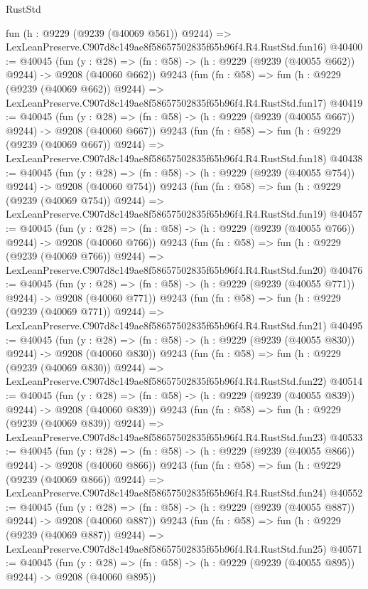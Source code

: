 \begin{lexlean}{RustStd}
\begin{coremodule}
    fun (h : @9229 (@9239 (@40069 @561)) @9244) =>
    LexLeanPreserve.C907d8c149ae8f58657502835f65b96f4.R4.RustStd.fun16)
@40400 := @40045
    (fun (y : @28) => (fn : @58) -> (h : @9229 (@9239 (@40055 @662)) @9244) -> @9208 (@40060 @662))
    @9243
    (fun (fn : @58) =>
    fun (h : @9229 (@9239 (@40069 @662)) @9244) =>
    LexLeanPreserve.C907d8c149ae8f58657502835f65b96f4.R4.RustStd.fun17)
@40419 := @40045
    (fun (y : @28) => (fn : @58) -> (h : @9229 (@9239 (@40055 @667)) @9244) -> @9208 (@40060 @667))
    @9243
    (fun (fn : @58) =>
    fun (h : @9229 (@9239 (@40069 @667)) @9244) =>
    LexLeanPreserve.C907d8c149ae8f58657502835f65b96f4.R4.RustStd.fun18)
@40438 := @40045
    (fun (y : @28) => (fn : @58) -> (h : @9229 (@9239 (@40055 @754)) @9244) -> @9208 (@40060 @754))
    @9243
    (fun (fn : @58) =>
    fun (h : @9229 (@9239 (@40069 @754)) @9244) =>
    LexLeanPreserve.C907d8c149ae8f58657502835f65b96f4.R4.RustStd.fun19)
@40457 := @40045
    (fun (y : @28) => (fn : @58) -> (h : @9229 (@9239 (@40055 @766)) @9244) -> @9208 (@40060 @766))
    @9243
    (fun (fn : @58) =>
    fun (h : @9229 (@9239 (@40069 @766)) @9244) =>
    LexLeanPreserve.C907d8c149ae8f58657502835f65b96f4.R4.RustStd.fun20)
@40476 := @40045
    (fun (y : @28) => (fn : @58) -> (h : @9229 (@9239 (@40055 @771)) @9244) -> @9208 (@40060 @771))
    @9243
    (fun (fn : @58) =>
    fun (h : @9229 (@9239 (@40069 @771)) @9244) =>
    LexLeanPreserve.C907d8c149ae8f58657502835f65b96f4.R4.RustStd.fun21)
@40495 := @40045
    (fun (y : @28) => (fn : @58) -> (h : @9229 (@9239 (@40055 @830)) @9244) -> @9208 (@40060 @830))
    @9243
    (fun (fn : @58) =>
    fun (h : @9229 (@9239 (@40069 @830)) @9244) =>
    LexLeanPreserve.C907d8c149ae8f58657502835f65b96f4.R4.RustStd.fun22)
@40514 := @40045
    (fun (y : @28) => (fn : @58) -> (h : @9229 (@9239 (@40055 @839)) @9244) -> @9208 (@40060 @839))
    @9243
    (fun (fn : @58) =>
    fun (h : @9229 (@9239 (@40069 @839)) @9244) =>
    LexLeanPreserve.C907d8c149ae8f58657502835f65b96f4.R4.RustStd.fun23)
@40533 := @40045
    (fun (y : @28) => (fn : @58) -> (h : @9229 (@9239 (@40055 @866)) @9244) -> @9208 (@40060 @866))
    @9243
    (fun (fn : @58) =>
    fun (h : @9229 (@9239 (@40069 @866)) @9244) =>
    LexLeanPreserve.C907d8c149ae8f58657502835f65b96f4.R4.RustStd.fun24)
@40552 := @40045
    (fun (y : @28) => (fn : @58) -> (h : @9229 (@9239 (@40055 @887)) @9244) -> @9208 (@40060 @887))
    @9243
    (fun (fn : @58) =>
    fun (h : @9229 (@9239 (@40069 @887)) @9244) =>
    LexLeanPreserve.C907d8c149ae8f58657502835f65b96f4.R4.RustStd.fun25)
@40571 := @40045
    (fun (y : @28) => (fn : @58) -> (h : @9229 (@9239 (@40055 @895)) @9244) -> @9208 (@40060 @895))

\end{coremodule}
\end{lexlean}
